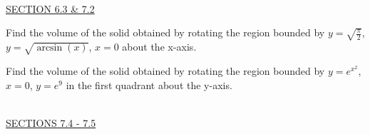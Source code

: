 \documentclass{exam}
\begin{document}
\begin{questions}
\newpage\thispagestyle{empty}

\ \\
\underline{SECTION 6.3 \& 7.2 }

\question Find the volume of the solid obtained by rotating the region bounded by $y = \sqrt{\frac{\pi}{2}}$, $y= \sqrt{\arcsin(x)}$, $x=0$ about the x-axis.

\question Find the volume of the solid obtained by rotating the region bounded by $y=e^{x^2}$, $x=0$, $y = e^{9}$ in the first quadrant about the y-axis.




\ \\
\underline{SECTIONS 7.4 - 7.5 }


\end{questions}
\end{document}
